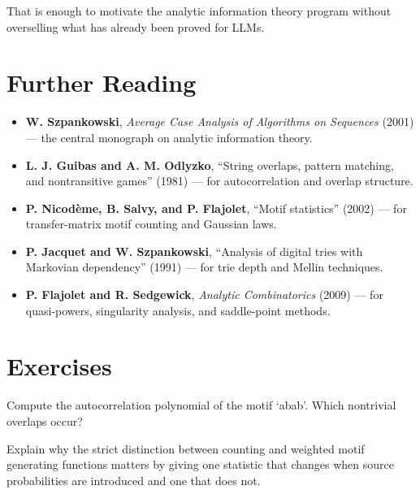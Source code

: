That is enough to motivate the analytic information theory program without overselling what has already been proved for LLMs.

\section*{Further Reading}

\begin{itemize}
  \item \textbf{W. Szpankowski}, \emph{Average Case Analysis of Algorithms on Sequences} (2001) \cite{Szpankowski2001} --- the central monograph on analytic information theory.
  \item \textbf{L. J. Guibas and A. M. Odlyzko}, ``String overlaps, pattern matching, and nontransitive games'' (1981) \cite{GuibasOdlyzko1981} --- for autocorrelation and overlap structure.
  \item \textbf{P. Nicodème, B. Salvy, and P. Flajolet}, ``Motif statistics'' (2002) \cite{NicodemeSalvyFlajolet2002} --- for transfer-matrix motif counting and Gaussian laws.
  \item \textbf{P. Jacquet and W. Szpankowski}, ``Analysis of digital tries with Markovian dependency'' (1991) \cite{JacquetSzpankowski1991} --- for trie depth and Mellin techniques.
  \item \textbf{P. Flajolet and R. Sedgewick}, \emph{Analytic Combinatorics} (2009) \cite{FlajoletSedgewick2009} --- for quasi-powers, singularity analysis, and saddle-point methods.
\end{itemize}

\section*{Exercises}

\begin{exercise}
Compute the autocorrelation polynomial of the motif `abab'. Which nontrivial overlaps occur?
\end{exercise}

\begin{exercise}
Explain why the strict distinction between counting and weighted motif generating functions matters by giving one statistic that changes when source probabilities are introduced and one that does not.
\end{exercise}
